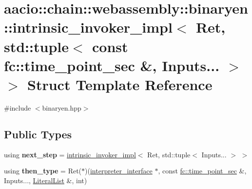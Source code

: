 \hypertarget{structaacio_1_1chain_1_1webassembly_1_1binaryen_1_1intrinsic__invoker__impl_3_01_ret_00_01std_1_834ee73b2a3756c62e2c1ce53ff47e23}{}\section{aacio\+:\+:chain\+:\+:webassembly\+:\+:binaryen\+:\+:intrinsic\+\_\+invoker\+\_\+impl$<$ Ret, std\+:\+:tuple$<$ const fc\+:\+:time\+\_\+point\+\_\+sec \&, Inputs... $>$ $>$ Struct Template Reference}
\label{structaacio_1_1chain_1_1webassembly_1_1binaryen_1_1intrinsic__invoker__impl_3_01_ret_00_01std_1_834ee73b2a3756c62e2c1ce53ff47e23}


{\ttfamily \#include $<$binaryen.\+hpp$>$}

\subsection*{Public Types}
\begin{DoxyCompactItemize}
\item 
\mbox{\label{structaacio_1_1chain_1_1webassembly_1_1binaryen_1_1intrinsic__invoker__impl_3_01_ret_00_01std_1_834ee73b2a3756c62e2c1ce53ff47e23_a5bd33332b5baa84833e1935fcf86ae26}} 
using {\bfseries next\+\_\+step} = \mbox{\hyperlink{structaacio_1_1chain_1_1webassembly_1_1binaryen_1_1intrinsic__invoker__impl}{intrinsic\+\_\+invoker\+\_\+impl}}$<$ Ret, std\+::tuple$<$ Inputs... $>$ $>$
\item 
\mbox{\label{structaacio_1_1chain_1_1webassembly_1_1binaryen_1_1intrinsic__invoker__impl_3_01_ret_00_01std_1_834ee73b2a3756c62e2c1ce53ff47e23_ab3dd7731ead24e1c5660dece4357b7d5}} 
using {\bfseries then\+\_\+type} = Ret($\ast$)(\mbox{\hyperlink{structaacio_1_1chain_1_1webassembly_1_1binaryen_1_1interpreter__interface}{interpreter\+\_\+interface}} $\ast$, const \mbox{\hyperlink{classfc_1_1time__point__sec}{fc\+::time\+\_\+point\+\_\+sec}} \&, Inputs..., \mbox{\hyperlink{classstd_1_1vector}{Literal\+List}} \&, int)
\end{DoxyCompactItemize}
